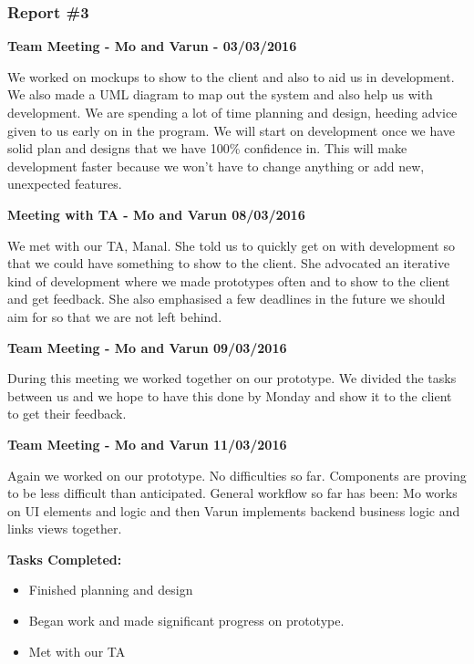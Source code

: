 \documentclass[12pt]{article}
\begin{document}
\subsubsection{Report \#3}
\textbf{Team Meeting - Mo and Varun - 03/03/2016}
\par
	We worked on mockups to show to the client and also to aid us in development. We also made a UML diagram to map out the system and also help us with development. We are spending a lot of time planning and design, heeding advice given to us early on in the program. We will start on development once we have solid plan and designs that we have 100\% confidence in. This will make development faster because we won’t have to change anything or add new, unexpected features. 
\par
\bigskip
	
	\textbf{Meeting with TA - Mo and Varun 08/03/2016}
\par
We met with our TA, Manal. She told us to quickly get on with development so that we could have something to show to the client. She advocated an iterative kind of development where we made prototypes often and to show to the client and get feedback. She also emphasised a few deadlines in the future we should aim for so that we are not left behind. 
\par
\bigskip	
	\textbf{Team Meeting - Mo and Varun 09/03/2016}
\par
	During this meeting we worked together on our prototype. We divided the tasks between us and we hope to have this done by Monday and show it to the client to get their feedback.
\par
\bigskip
	\textbf{Team Meeting - Mo and Varun 11/03/2016}
\par
\bigskip
	Again we worked on our prototype. No difficulties so far. Components are proving to be less difficult than anticipated. General workflow so far has been: Mo works on UI elements and logic and then Varun implements backend business logic and links views together. 
\par 
\bigskip

\textbf{Tasks Completed:}
\begin{itemize}
\item Finished planning and design
\item Began work and made significant progress on prototype.
\item Met with our TA
\end{itemize}
\par
\bigskip
\end{document}
